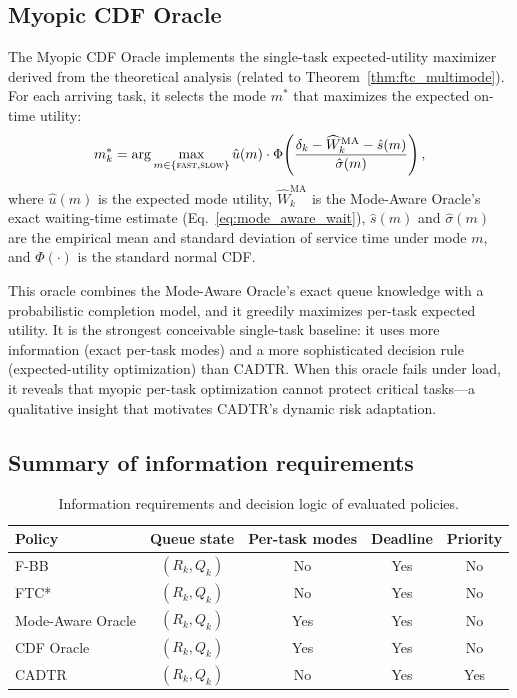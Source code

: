 \documentclass[preprint,12pt]{elsarticle}
\begin{document}
\subsection{Myopic CDF Oracle}
\label{sec:baseline_cdf_oracle}

The Myopic CDF Oracle implements the single-task expected-utility maximizer derived from the theoretical analysis (related to Theorem~\ref{thm:ftc_multimode}). For each arriving task, it selects the mode $m^{\ast}$ that maximizes the expected on-time utility:
\begin{equation}
m_k^{\ast} = \arg\max_{m \in \{\textsc{fast}, \textsc{slow}\}} \hat{u}(m) \cdot \Phi\!\left(\frac{\delta_k - \widehat{W}_k^{\mathrm{MA}} - \hat{s}(m)}{\hat{\sigma}(m)}\right),
\label{eq:cdf_oracle}
\end{equation}
where $\hat{u}(m)$ is the expected mode utility, $\widehat{W}_k^{\mathrm{MA}}$ is the Mode-Aware Oracle's exact waiting-time estimate (Eq.~\ref{eq:mode_aware_wait}), $\hat{s}(m)$ and $\hat{\sigma}(m)$ are the empirical mean and standard deviation of service time under mode $m$, and $\Phi(\cdot)$ is the standard normal CDF.

This oracle combines the Mode-Aware Oracle's exact queue knowledge with a probabilistic completion model, and it greedily maximizes per-task expected utility. It is the strongest conceivable single-task baseline: it uses more information (exact per-task modes) and a more sophisticated decision rule (expected-utility optimization) than CADTR. When this oracle fails under load, it reveals that myopic per-task optimization cannot protect critical tasks---a qualitative insight that motivates CADTR's dynamic risk adaptation.

\subsection{Summary of information requirements}
\label{sec:baseline_summary}

\begin{table}[t]
\centering
\caption{Information requirements and decision logic of evaluated policies.}
\label{tab:info_requirements}
\begin{tabular}{lcccc}
\toprule
\textbf{Policy} & \textbf{Queue state} & \textbf{Per-task modes} & \textbf{Deadline} & \textbf{Priority} \\
\midrule
F-BB            & $(R_k, Q_k)$ & No  & Yes & No  \\
FTC*            & $(R_k, Q_k)$ & No  & Yes & No  \\
Mode-Aware Oracle & $(R_k, Q_k)$ & Yes & Yes & No  \\
CDF Oracle      & $(R_k, Q_k)$ & Yes & Yes & No  \\
CADTR           & $(R_k, Q_k)$ & No  & Yes & Yes \\
\bottomrule
\end{tabular}
\end{table}
\end{document}
